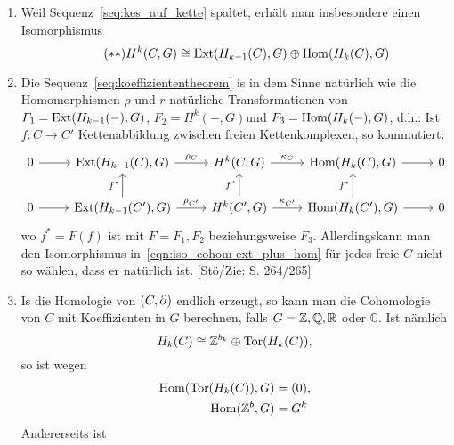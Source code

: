 
\begin{kommentar}
  \begin{enumerate}
    \item
      Weil Sequenz~\eqref{seq:kes_auf_kette} spaltet, erhält man insbesondere einen Isomorphismus
      \begin{equation*}
        \label{eqn:iso_cohom-ext_plus_hom}
        \tag{$\ast\ast$}
        H^k(C,G) \cong \mathrm{Ext}(H_{k-1}(C),G) \oplus \mathrm{Hom}(H_k(C),G)
      \end{equation*}
    \item
      Die Sequenz~\eqref{seq:koeffiziententheorem} is in dem Sinne natürlich wie die Homomorphismen $\rho$ und $r$ natürliche Transformationen von $F_1 = \mathrm{Ext}(H_{k-1}(-),G)$, $F_2 = H^k(-,G)$und $F_3 = \mathrm{Hom}(H_k(-),G)$, d.h.:
      Ist $f \colon C \to C'$ Kettenabbildung zwischen freien Kettenkomplexen, so kommutiert:
      \begin{equation*}
        \begin{tikzcd}
          0 \arrow{r}{}
          & \Ext(H_{k-1}(C),G) \arrow{r}{\rho_C}
          & H^k(C,G) \arrow{r}{\kappa_C}
          & \Hom(H_k(C),G) \arrow{r}{}
          & 0 \\
          0 \arrow{r}{}
          & \Ext(H_{k-1}(C'),G) \arrow{r}{\rho_{C'}}
            \arrow{u}{f^*}
          & H^k(C',G) \arrow{r}{\kappa_{C'}}
            \arrow{u}{f^*}
          & \Hom(H_k(C'),G) \arrow{r}{}
            \arrow{u}{f^*}
          & 0
        \end{tikzcd}
      \end{equation*}
      wo $f^* = F(f)$ ist mit $F = F_1,F_2$ beziehungsweise $F_3$.
      Allerdingskann man den Isomorphismus in~\eqref{eqn:iso_cohom-ext_plus_hom} für jedes freie $C$ nicht so wählen, dass er natürlich ist.
      [Stö/Zie: S. 264/265]
    \item
      Is die Homologie von $(C,\partial)$ endlich erzeugt, so kann man die Cohomologie von $C$ mit Koeffizienten in $G$ berechnen, falls $G = \mathbb{Z},\mathbb{Q},\mathbb{R}$ oder $\mathbb C$.
      Ist nämlich
      \begin{equation*}
        H_k(C) \cong \mathbb{Z}^{b_k} \oplus \mathrm{Tor}(H_k(C)),
      \end{equation*}
      so ist wegen
      \begin{align*}
        \mathrm{Hom}(\mathrm{Tor}(H_k(C)),G) & = (0),\\
      \mathrm{Hom}(\mathbb{Z}^b,G) & = G^k
      \end{align*}
      Andererseits ist
      \begin{equation*}

\end{equation*}
\end{enumerate}
\end{kommentar}
